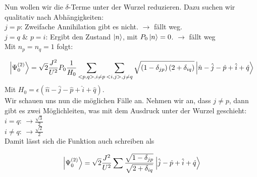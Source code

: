 Nun wollen wir die $\delta$-Terme unter der Wurzel reduzieren. Dazu suchen wir qualitativ nach Abh\"angigkeiten:\\
$j=p$: Zweifache Annihilation gibt es nicht. $\rightarrow$ f\"allt weg. \\
$j=q$ \& $p=i$: Ergibt den Zustand $\Ket{n}$, mit $P_0 \Ket{n} = 0$. $\rightarrow$ f\"allt weg \\

Mit $n_p = n_q = 1$ folgt:

\begin{equation}
\Ket{\Psi_0^{\left( 2 \right)}} = \sqrt{2} \frac{J^2}{U^2} P_0 \frac{1}{H_0} \sum_{<p,q>, i \neq p} \sum_{<i,j>, j \neq q} \sqrt{\left(1-\delta_{jp}\right) \left(2+ \delta_{iq}\right)} \Ket{\hat{n} - \hat{j} -\hat{p} + \hat{i} +\hat{q}}
\end{equation}
Mit $H_0 = \epsilon \left( \hat{n} - \hat{j} -\hat{p} + \hat{i} +\hat{q} \right)$.\\
Wir schauen uns nun die m\"oglichen F\"alle an. Nehmen wir an, dass $j \neq p$, dann gibt es zwei M\"oglichleiten, was mit dem Ausdruck unter der Wurzel geschieht:\\
$i=q$: $\rightarrow \frac{\sqrt{3}}{2}$\\
$i \neq q$: $\rightarrow \frac{\sqrt{2}}{2}$\\
Damit l\"asst sich die Funktion auch schreiben als

\begin{equation}
\Ket{\Psi_0^{\left( 2 \right)}} = \sqrt{2} \frac{J^2}{U^2} \sum \frac{\sqrt{1-\delta_{jp}}}{\sqrt{2+\delta_{iq}}}  \Ket{\hat{j} -\hat{p} + \hat{i} +\hat{q}}
\end{equation}

